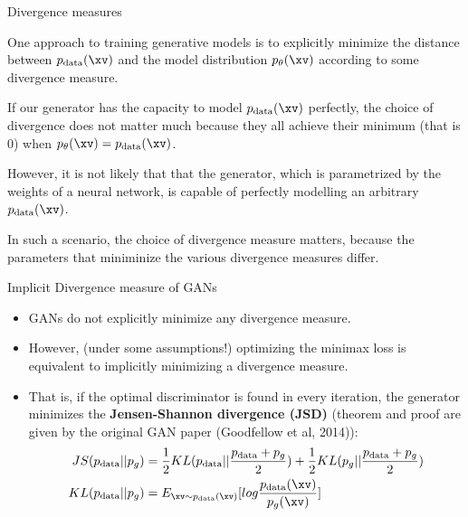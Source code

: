\documentclass[11pt,compress,t,notes=noshow, xcolor=table]{beamer}
\begin{document}
\begin{frame} {Divergence measures}
  \begin{itemize}
    \small{\item One approach to training generative models is to explicitly minimize the distance between $p_{\text{data}}(\xv)$ and the model distribution $p_{\theta}(\xv)$ according to some divergence measure.
    \vspace{2mm}
    \item If our generator has the capacity to model $p_{\text{data}}(\xv)$ perfectly, the choice of divergence does not matter much because they all achieve their minimum (that is 0) when $p_{\theta}(\xv) = p_{\text{data}}(\xv)$.
    \vspace{2mm}
    \item However, it is not likely that that the generator, which is  parametrized by the weights of a neural network, is capable of perfectly modelling an arbitrary $ p_{\text{data}}(\xv)$.
    \vspace{2mm}
    \item In such a scenario, the choice of divergence measure matters, because the parameters that miniminize the various divergence measures differ.}
  \end{itemize}
\end{frame}

\begin{frame} {Implicit Divergence measure of GANs}
  \begin{itemize}
   \item GANs do not explicitly minimize any divergence measure.
   \item However, (under some assumptions!) optimizing the minimax loss is equivalent to implicitly minimizing a divergence measure.
    \item That is, if the optimal discriminator is found in every iteration,  the generator minimizes %
    the  \textbf{Jensen-Shannon divergence  (JSD)} (theorem and proof are given by the original GAN paper (Goodfellow et al, 2014)):
    \begin{align*}
      JS(p_{\text{data}}||p_g) & =  \frac{1}{2} KL(p_{\text{data}}||\frac{p_{\text{data}}+p_g}{2}) + \frac{1}{2}  KL(p_g || \frac {p_{\text{data}} + p_g}{2}) \\
        KL(p_{\text{data}}||p_g) & = E_{\xv \sim p_{\text{data}}(\xv)}[log \frac {p_{\text{data}}(\xv)}{p_g(\xv)}]
    \end{align*}
  \end{itemize}
\end{frame}
\end{document}
